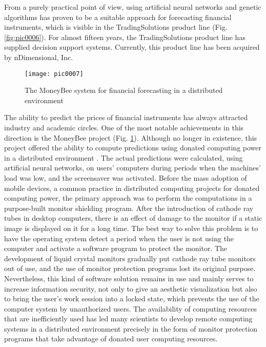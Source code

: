 From a purely practical point of view, using artificial neural networks and genetic algorithms has proven to be a suitable approach for forecasting financial instruments, which is visible in the TradingSolutions product line (Fig. \ref{fig:pic0006}). For almost fifteen years, the TradingSolutions product line has supplied decision support systems. Currently, this product line has been acquired by nDimensional, Inc.

\begin{figure}[h]
\centering
\texttt{[image: pic0007]}
\caption{The MoneyBee system for financial forecasting in a distributed environment}
\label{fig:pic0007}
\end{figure}

The ability to predict the prices of financial instruments has always attracted industry and academic circles. One of the most notable achievements in this direction is the MoneyBee project (Fig. \ref{fig:pic0007}). Although no longer in existence, this project offered the ability to compute predictions using donated computing power in a distributed environment \cite{bohn}. The actual predictions were calculated, using artificial neural networks, on users' computers during periods when the machines' load was low, and the screensaver was activated. Before the mass adoption of mobile devices, a common practice in distributed computing projects for donated computing power, the primary approach was to perform the computations in a purpose-built monitor shielding program. After the introduction of cathode ray tubes in desktop computers, there is an effect of damage to the monitor if a static image is displayed on it for a long time. The best way to solve this problem is to have the operating system detect a period when the user is not using the computer and activate a software program to protect the monitor. The development of liquid crystal monitors gradually put cathode ray tube monitors out of use, and the use of monitor protection programs lost its original purpose. Nevertheless, this kind of software solution remains in use and mainly serves to increase information security, not only to give an aesthetic visualization but also to bring the user's work session into a locked state, which prevents the use of the computer system by unauthorized users. The availability of computing resources that are inefficiently used has led many scientists to develop remote computing systems in a distributed environment precisely in the form of monitor protection programs that take advantage of donated user computing resources.

